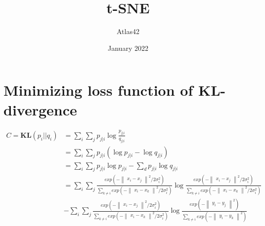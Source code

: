 \documentclass{article}
\title{t-SNE}
\author{Atlas42 }
\date{January 2022}
\begin{document}
\maketitle

\section{Minimizing loss function of KL-divergence}
$\begin{aligned}
C = \textbf{KL}(p_{i} || q_{i})
&= \sum_i \sum_j p_{j|i} \log  \frac{p_{j|i}}{q_{j|i}} \\
&= \sum_i \sum_j p_{j|i} \left( \log p_{j|i} - \log q_{j|i} \right) \\
&= \sum_i \sum_j p_{j|i} \log p_{j|i} - \sum_d p_{j|i} \log q_{j|i} \\
&= \sum_i \sum_j \frac{exp(- \begin{Vmatrix}
x_{i} - x_{j}
\end{Vmatrix}^{2} / 2\sigma^{2}_{i})}{\sum_{k \neq i} exp(- \begin{Vmatrix}
x_{i} - x_{k}
\end{Vmatrix}^{2} / 2\sigma^{2}_{i})} \log \frac{exp(- \begin{Vmatrix}
x_{i} - x_{j}
\end{Vmatrix}^{2} / 2\sigma^{2}_{i})}{\sum_{k \neq i} exp(- \begin{Vmatrix}
x_{i} - x_{k}
\end{Vmatrix}^{2} / 2\sigma^{2}_{i})}\\ 
& - \sum_i \sum_j \frac{exp(- \begin{Vmatrix}
x_{i} - x_{j}
\end{Vmatrix}^{2} / 2\sigma^{2}_{i})}{\sum_{k \neq i} exp(- \begin{Vmatrix}
x_{i} - x_{k}
\end{Vmatrix}^{2} / 2\sigma^{2}_{i})} \log \frac{exp(- \begin{Vmatrix}
y_{i} - y_{j}
\end{Vmatrix}^{2})}{\sum_{k \neq i} exp(- \begin{Vmatrix}
y_{i} - y_{k}
\end{Vmatrix}^{2})} \\
\end{aligned}$\\
\end{document}
